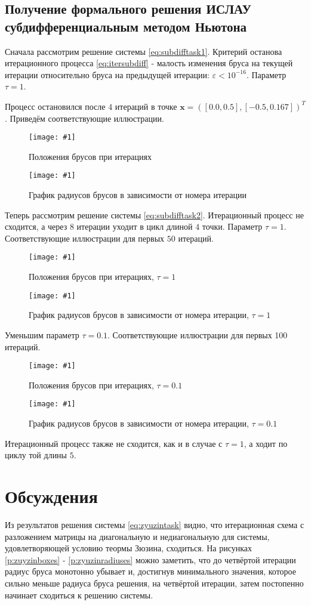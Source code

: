 \documentclass[a4paper,12pt]{article}
\newcommand{\plot}[3]{
    \begin{figure}[H]
        \texttt{[image: \#1]}
        \caption{#2}
        \label{#3}
    \end{figure}
}
\begin{document}
    \subsection{Получение формального решения ИСЛАУ субдифференциальным методом Ньютона}
    Сначала рассмотрим решение системы \ref{eq:subdifftask1}. \newline
    Критерий останова итерационного процесса \ref{eq:itersubdiff} - малость изменения бруса на текущей итерации относительно бруса на предыдущей итерации: $ \varepsilon < 10^{-16} $.
    Параметр $ \tau = 1 $.

    \noindent Процесс остановился после $ 4 $ итераций в точке $ \textbf{x} = ([0.0, 0.5], [-0.5, 0.167])^{T} $. \newline
    Приведём соответствующие иллюстрации.
    \plot{SubdifferentialNewtonTask1Boxes}{Положения брусов при итерациях}{p:subdifftask1boxes}
    \plot{SubdifferentialNewtonTask1Radiuses}{График радиусов брусов в зависимости от номера итерации}{p:subdifftask2radiuses}

    \noindent
    Теперь рассмотрим решение системы \ref{eq:subdifftask2}. \newline
    Итерационный процесс не сходится, а через $ 8 $ итерации уходит в цикл длиной $ 4 $ точки. 
    Параметр $ \tau = 1 $.
    Соответствующие иллюстрации для первых $ 50 $ итераций.
    \plot{SubdifferentialNewtonTask2Tau1Boxes}{Положения брусов при итерациях, $ \tau = 1 $}{p:subdifftask2tau1boxes}
    \plot{SubdifferentialNewtonTask2Tau1Radiuses}{График радиусов брусов в зависимости от номера итерации, $ \tau = 1 $}{p:subdifftask2tau1radiuses}

    \noindent
    Уменьшим параметр $ \tau = 0.1 $.
    Соответствующие иллюстрации для первых 100 итераций.
    \plot{SubdifferentialNewtonTask2Tau01Boxes}{Положения брусов при итерациях, $ \tau = 0.1 $}{p:subdifftask2tau01boxes}
    \plot{SubdifferentialNewtonTask2Tau01Radiuses}{График радиусов брусов в зависимости от номера итерации, $ \tau = 0.1 $}{p:subdifftask2tau01radiuses}
    Итерационный процесс также не сходится, как и в случае с $ \tau = 1 $, а ходит по циклу той длины $ 5 $.

    \section{Обсуждения}
    Из результатов решения системы \ref{eq:zyuzintask} видно, что итерационная схема с разложением матрицы на диагональную и недиагональную для системы, удовлетворяющей условию теормы Зюзина, сходиться.
    На рисунках \ref{p:zuyzinboxes} - \ref{p:zyuzinradiuses} можно заметить, что до четвёртой итерации радиус бруса монотонно убывает и, достигнув минимального значения, 
    которое сильно меньше радиуса бруса решения, на четвёртой итерации, затем постопенно начинает сходиться к решению системы. \newline
\end{document}
